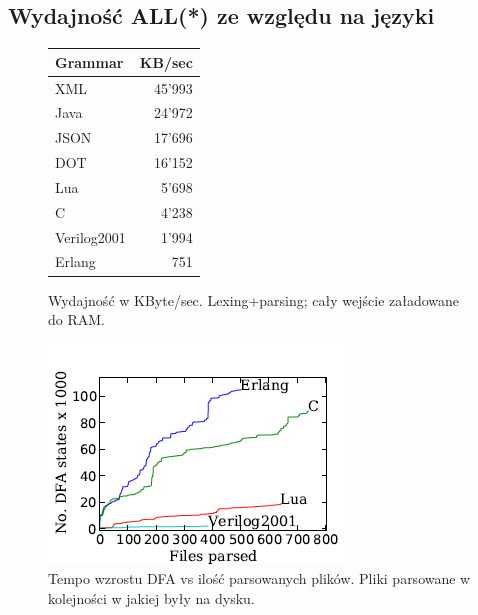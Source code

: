 \subsection{Wydajność ALL(*) ze względu na języki}
\begin{figure}[h]
\begin{tabular}{|l||r|}
\hline
Grammar & KB/sec \\
\hline\hline
XML & 45'993 \\
Java & 24'972 \\
JSON & 17'696 \\
DOT & 16'152 \\
Lua & 5'698 \\
C & 4'238 \\
Verilog2001 & 1'994 \\
Erlang &751 \\
\hline
\end{tabular}
\caption{Wydajność w
KByte/sec. Lexing+parsing;
cały wejście załadowane do RAM.}
\end{figure}

\begin{figure}[h]
\includegraphics[scale=0.8]{Figure12.png}
\caption{
Tempo wzrostu DFA vs ilość parsowanych plików.
Pliki parsowane w kolejności w jakiej były na dysku.
}
\end{figure}

